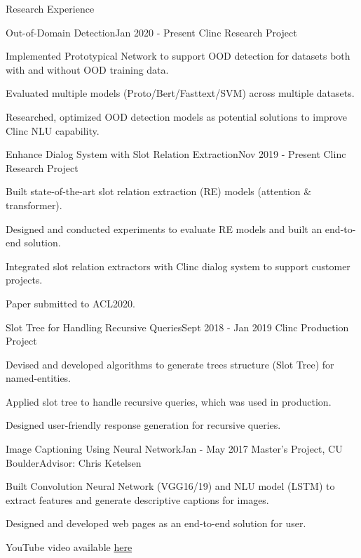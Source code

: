 \documentclass{resume} %
\begin{document}

\begin{rSection}{Research Experience}

\begin{rSubsection}{Out-of-Domain Detection}{Jan 2020 - Present }{Clinc Research Project}{}
\item Implemented Prototypical Network to support OOD detection for datasets both with and without OOD training data.
\item Evaluated multiple models (Proto/Bert/Fasttext/SVM) across multiple datasets.
\item Researched, optimized OOD detection models as potential solutions to improve Clinc NLU capability.
\end{rSubsection}

\begin{rSubsection}{Enhance Dialog System with Slot Relation Extraction}{Nov 2019 - Present }{Clinc Research Project}{}
\item Built state-of-the-art slot relation extraction (RE) models (attention $\&$ transformer).
\item Designed and conducted experiments to evaluate RE models and built an end-to-end solution.
\item Integrated slot relation extractors with Clinc dialog system to support customer projects.
\item Paper submitted to ACL2020.
\end{rSubsection}

\begin{rSubsection}{Slot Tree for Handling Recursive Queries}{Sept 2018 - Jan 2019 }{Clinc Production Project}{}
\item Devised and developed algorithms to generate trees structure (Slot Tree) for named-entities.
\item Applied slot tree to handle recursive queries, which was used in production. 
\item Designed user-friendly response generation for recursive queries.
\end{rSubsection}

\begin{rSubsection}{Image Captioning Using Neural Network}{Jan - May 2017 }{Master's Project, CU Boulder}{Advisor: Chris Ketelsen}
\item Built Convolution Neural Network (VGG16/19) and NLU model (LSTM) to extract features and generate descriptive captions for images.
\item Designed and developed web pages as an end-to-end solution for user.
\item YouTube video available \href{https://www.youtube.com/watch?v=f2waevH1b6I}{here}
\end{rSubsection}


\end{rSection}
\end{document}
